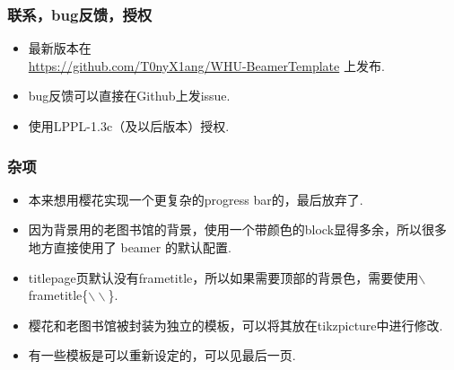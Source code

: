 \documentclass{beamer}
\begin{document}
\begin{frame}
    \frametitle{联系，bug反馈，授权}
    \begin{itemize}
        \item 最新版本在 \\ \url{https://github.com/T0nyX1ang/WHU-BeamerTemplate} 上发布.
        \item bug反馈可以直接在Github上发issue.
        \item 使用LPPL-1.3c（及以后版本）授权.
    \end{itemize}
\end{frame}

\begin{frame}
    \frametitle{杂项}
    \begin{itemize}
        \item 本来想用樱花实现一个更复杂的progress bar的，最后放弃了.
        \item 因为背景用的老图书馆的背景，使用一个带颜色的block显得多余，所以很多地方直接使用了 beamer 的默认配置.
        \item titlepage页\alert{默认没有}frametitle，所以如果需要顶部的背景色，需要使用$\backslash$frametitle\{$\backslash \backslash$\}.
        \item 樱花和老图书馆被封装为独立的模板，可以将其放在tikzpicture中进行修改.
        \item 有一些模板是可以重新设定的，可以见最后一页. \hyperlink{final}{}
    \end{itemize}
\end{frame}
\end{document}
